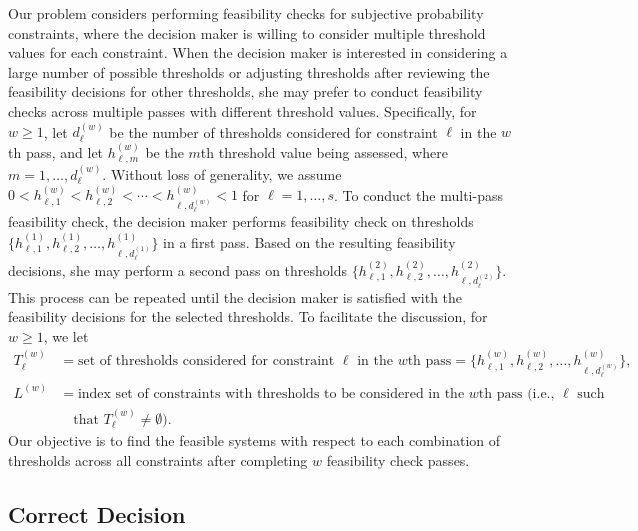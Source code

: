 \documentclass[11pt]{article}
\begin{document}
Our problem considers performing feasibility checks for subjective probability constraints, where the decision maker is willing to consider multiple threshold values for each constraint. When the decision maker is interested in considering a large number of possible thresholds or adjusting thresholds after reviewing the feasibility decisions for other thresholds, she may prefer to conduct feasibility checks across multiple passes with different threshold values. 
Specifically, for $w\geq 1$, let $d_\ell^{(w)}$ be the number of thresholds considered for constraint $\ell$ in the $w$th pass, and let $h_{\ell, m}^{(w)}$ be the $m$th threshold value being assessed, where $m=1,\ldots, d_\ell^{(w)}$. Without loss of generality, we assume $0< h_{\ell,1}^{(w)}< h_{\ell,2}^{(w)} < \cdots <h_{\ell,d_\ell^{(w)}}^{(w)}<1$ for $\ell=1,\ldots,s$. To conduct the multi-pass feasibility check, the decision maker performs feasibility check on thresholds $\{h_{\ell,1}^{(1)}, h_{\ell,2}^{(1)}, \ldots, h_{\ell,d_\ell^{(1)}}^{(1)}\}$ in a first pass. Based on the resulting feasibility decisions, she may perform a second pass on thresholds $\{h_{\ell,1}^{(2)}, h_{\ell,2}^{(2)}, \ldots, h_{\ell, d_\ell^{(2)}}^{(2)}\}$. This process can be repeated until the decision maker is satisfied with the feasibility decisions for the selected thresholds. 
To facilitate the discussion, for $w\geq 1$, we let 
\begin{align*}
    T_\ell^{(w)} &= \text{set of thresholds considered for constraint $\ell$ in the $w$th pass}= \{ h_{\ell, 1}^{(w)}, h_{\ell, 2}^{(w)}, \ldots, h_{\ell, d_\ell^{(w)}}^{(w)} \},  \\
    L^{(w)} &= \text{index set of constraints with thresholds to be considered in the $w$th pass (i.e., $\ell$ such } \\
    &\quad \text{that $T_\ell^{(w)}\not=\emptyset$).} 
\end{align*}
Our objective is to find the feasible systems with respect to each combination of thresholds across all constraints after completing $w$ feasibility check passes. 

\subsection{Correct Decision} 
\label{subsec:CorrectDecision}
\end{document}

